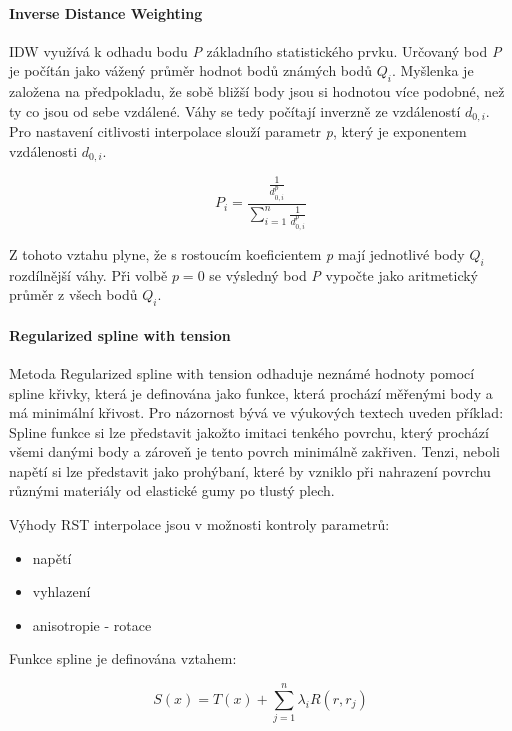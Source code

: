 \documentclass[a4paper,12pt,oneside]{report}
\begin{document}
\paragraph*{Inverse Distance Weighting}
\acs{IDW} využívá k odhadu bodu \emph{P} základního statistického prvku. Určovaný bod \emph{P}  je počítán jako vážený průměr hodnot  bodů známých bodů $Q_{i}$.  Myšlenka je založena na předpokladu, že sobě bližší body jsou si hodnotou více podobné, než ty co jsou od sebe vzdálené. Váhy se tedy počítají inverzně ze vzdáleností $d_{0,i}$. Pro nastavení citlivosti interpolace slouží parametr \emph{p}, který je exponentem  vzdálenosti $d_{0,i}$. \cite{spatialinter}

\begin{equation}
P_{i}=\frac{\frac{1}{d_{0,i}^{p}}}{\sum_{i=1}^{n}\frac{1}{d_{0,i}^{p}}}
\end{equation}

Z tohoto vztahu plyne, že s rostoucím koeficientem \emph{p} mají jednotlivé  body $Q_{i}$ rozdílnější váhy. Při volbě $p=0$ se výsledný bod \emph{P} vypočte jako aritmetický průměr z všech bodů $Q_{i}$.

\paragraph*{Regularized spline with tension}

Metoda Regularized spline with tension odhaduje neznámé hodnoty pomocí spline křivky, která je definována jako funkce, která prochází měřenými body a má minimální křivost. Pro názornost bývá ve výukových textech uveden příklad: Spline funkce si lze představit jakožto imitaci tenkého povrchu, který prochází všemi danými body a zároveň je tento povrch minimálně zakřiven. Tenzi, neboli napětí si lze představit jako prohýbaní, které by vzniklo při nahrazení povrchu různými materiály od elastické gumy po tlustý plech.

Výhody RST interpolace jsou v možnosti kontroly parametrů:

\begin{itemize}
\item napětí
\item vyhlazení
\item anisotropie - rotace
\end{itemize}
Funkce spline je definována vztahem:

\begin{equation}
S(x)=T(x)+\sum_{j=1}^{n}\lambda_{i}R(r,r_{j})
\end{equation}
\end{document}
